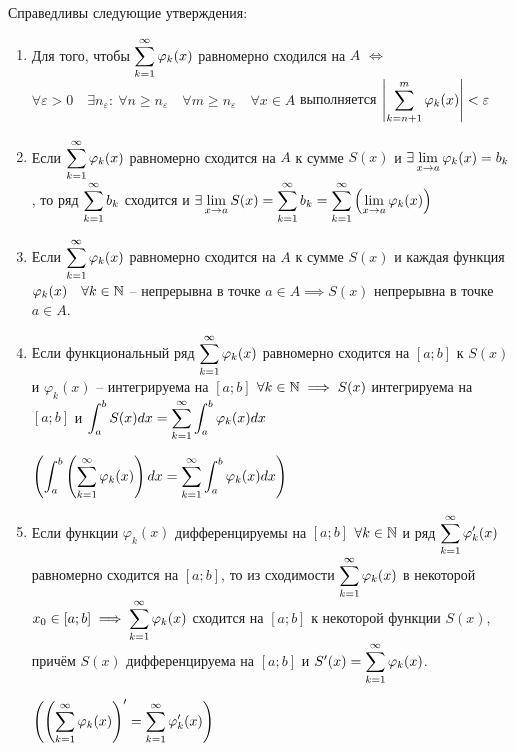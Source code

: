 \begin{theorem}
    Справедливы следующие утверждения:

    \begin{enumerate}
        \item
            Для того, чтобы $\displaystyle\sum_{k=1}^\infty \varphi_k(x)$ равномерно сходился на $A$ $\iff$
            $\forall \varepsilon > 0 \quad \exists n_\varepsilon: \: 
            \forall n \geq n_\varepsilon \quad \forall m \geq n_\varepsilon \quad
            \forall x \in A$ выполняется 
            $\left| \displaystyle\sum_{k=n+1}^m \varphi_k(x) \right| < \varepsilon$
        
        \item
            Если $\displaystyle\sum_{k=1}^\infty \varphi_k(x)$ равномерно сходится на $A$ к сумме
            $S(x)$ и $\exists \displaystyle\lim_{x \to a} \varphi_k(x) = b_k$, то ряд
            $\displaystyle\sum_{k=1}^\infty b_k$ сходится и $\exists \displaystyle\lim_{x \to a} S(x) =
            \displaystyle\sum_{k=1}^\infty b_k = \displaystyle\sum_{k=1}^\infty \left( \displaystyle\lim_{x \to a} \varphi_k(x) \right)$

        \item 
            Если $\displaystyle\sum_{k=1}^\infty \varphi_k(x)$ равномерно сходится на $A$ к сумме
            $S(x)$ и каждая функция $\varphi_k(x) \quad \forall k \in \mathbb{N}$ --
            непрерывна в точке $a \in A \implies S(x)$ непрерывна в точке $a \in A$.
        
        \item
            Если функциональный ряд $\displaystyle\sum_{k=1}^\infty \varphi_k(x)$ равномерно сходится
            на $[a; b]$ к $S(x)$ и $\varphi_k(x)$ -- интегрируема на $[a; b]$
            $\forall k \in \mathbb{N} \implies S(x)$ интегрируема на $[a; b]$ и
            $\displaystyle\int_a^b S(x) dx = \displaystyle\sum_{k=1}^\infty \int_a^b \varphi_k(x) dx$

            $\left( \displaystyle\int_a^b \left(\displaystyle\sum_{k=1}^\infty \varphi_k(x)\right) dx = \displaystyle\sum_{k=1}^\infty \int_a^b \varphi_k(x) dx \right)$

        \item
            Если функции $\varphi_k(x)$ дифференцируемы на $[a; b]$
            $\forall k \in \mathbb{N}$ и ряд $\displaystyle\sum_{k=1}^\infty \varphi'_k(x)$ равномерно
            сходится на $[a; b]$, то из сходимости $\displaystyle\sum_{k=1}^\infty \varphi_k(x)$ в
            некоторой $x_0 \in [a; b] \implies \displaystyle\sum_{k=1}^\infty \varphi_k(x)$ сходится
            на $[a; b]$ к некоторой функции $S(x)$, причём $S(x)$ 
            дифференцируема на $[a; b]$ и $S'(x) = \displaystyle\sum_{k=1}^\infty \varphi_k(x)$.

            $\left( \left( \displaystyle\sum_{k=1}^\infty \varphi_k(x) \right)' = \displaystyle\sum_{k=1}^\infty \varphi'_k(x) \right)$
    \end{enumerate}
\end{theorem}

